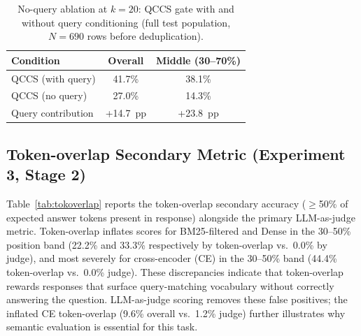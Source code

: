\documentclass{article}
\begin{document}
\begin{table}[H]
\centering
\caption{No-query ablation at $k{=}20$: QCCS gate with and without query
  conditioning (full test population, $N{=}690$ rows before deduplication).}
\label{tab:ablation_noq}
\small
\begin{tabular}{@{}lcc@{}}
\toprule
Condition & Overall & Middle (30--70\%) \\
\midrule
QCCS (with query) & 41.7\% & 38.1\% \\
QCCS (no query)   & 27.0\% & 14.3\% \\
\midrule
Query contribution & +14.7~pp & +23.8~pp \\
\bottomrule
\end{tabular}
\end{table}


\subsection{Token-overlap Secondary Metric (Experiment 3, Stage 2)}
\label{app:tokoverlap}

Table~\ref{tab:tokoverlap} reports the token-overlap secondary accuracy
($\geq$50\% of expected answer tokens present in response) alongside the
primary LLM-as-judge metric. Token-overlap inflates scores for BM25-filtered
and Dense in the 30--50\% position band (22.2\% and 33.3\% respectively by
token-overlap vs.\ 0.0\% by judge), and most severely for cross-encoder (CE) in
the 30--50\% band (44.4\% token-overlap vs.\ 0.0\% judge). These discrepancies
indicate that token-overlap rewards responses that surface query-matching vocabulary
without correctly answering the question. LLM-as-judge scoring removes these
false positives; the inflated CE token-overlap (9.6\% overall vs.\ 1.2\% judge)
further illustrates why semantic evaluation is essential for this task.
\end{document}
